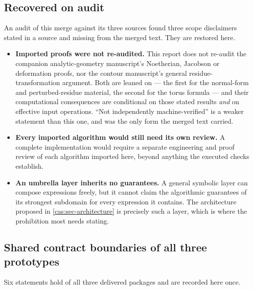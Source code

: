 \documentclass[11pt,letterpaper]{article}
\numberwithin{equation}{section}
\theoremstyle{definition}
\theoremstyle{remark}
\begin{document}
\subsection{Recovered on audit}
An audit of this merge against its three sources found three scope disclaimers
stated in a source and missing from the merged text. They are restored here.

\begin{itemize}
\item \textbf{Imported proofs were not re-audited.} This report does not
re-audit the companion analytic-geometry manuscript's Noetherian, Jacobson or
deformation proofs, nor the contour manuscript's general
residue-transformation argument. Both are leaned on --- the first for the
normal-form and perturbed-residue material, the second for the torus formula
--- and their computational consequences are conditional on those stated
results \emph{and} on effective input operations. ``Not independently
machine-verified'' is a weaker statement than this one, and was the only form
the merged text carried.
\item \textbf{Every imported algorithm would still need its own review.} A
complete implementation would require a separate engineering and proof review
of each algorithm imported here, beyond anything the executed checks establish.
\item \textbf{An umbrella layer inherits no guarantees.} A general symbolic
layer can compose expressions freely, but it cannot claim the algorithmic
guarantees of its strongest subdomain for every expression it contains. The
architecture proposed in \cref{cas:sec-architecture} is precisely such a layer,
which is where the prohibition most needs stating.
\end{itemize}

\subsection{Shared contract boundaries of all three prototypes}
\label{cas:sub-sharedboundaries}
Six statements hold of all three delivered packages and are recorded here once.
\end{document}
